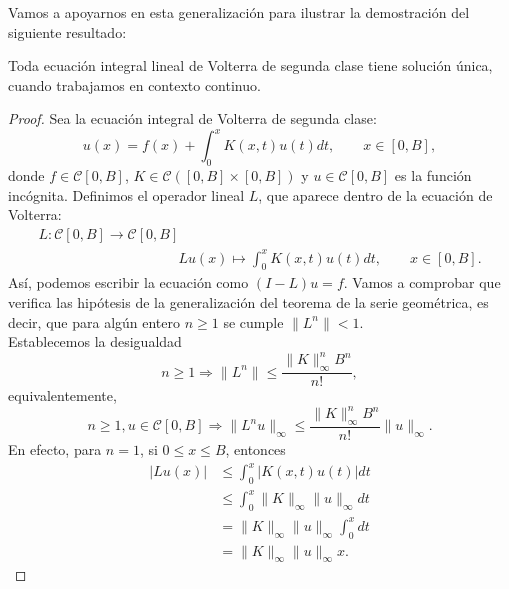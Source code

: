 Vamos a apoyarnos en esta generalización para ilustrar la demostración del siguiente resultado:
\begin{corolario}
	Toda ecuación integral lineal de Volterra de segunda clase tiene solución única, cuando trabajamos en contexto continuo.
\end{corolario}
\begin{proof}
	Sea la ecuación integral de Volterra de segunda clase:
	\begin{equation}
		u(x) = f(x) + \int_0^x K(x,t)u(t)dt, \qquad x \in [0,B],
	\end{equation}
	donde $f \in \mathcal{C}[0,B]$, $K \in \mathcal{C}([0,B]\times [0,B])$ y $u \in \mathcal{C}[0,B]$ es la función incógnita.
	Definimos el operador lineal $L$, que aparece dentro de la ecuación de Volterra:
	\begin{equation}
		\begin{array}{c}
		L: \mathcal{C}[0,B] \rightarrow \mathcal{C}[0,B] \\
		\qquad \qquad \qquad \qquad \qquad Lu(x) \mapsto \displaystyle \int_{0}^{x} K(x,t)u(t)dt, \qquad x \in [0,B].
		\end{array}
	\end{equation}
	Así, podemos escribir la ecuación como $(I-L)u = f$.
	Vamos a comprobar que verifica las hipótesis de la generalización del teorema de la serie geométrica, es decir, que para algún entero $n \geqslant 1$ se cumple $\lVert L^n \rVert < 1$.\\
	Establecemos la desigualdad
	\begin{equation}
		n \geqslant 1 \Rightarrow \lVert L^n \rVert \leqslant \dfrac{\lVert K \rVert_\infty^nB^n}{n!},
	\end{equation}
	equivalentemente,
	\begin{equation}\label{eq:ref}
		n \geqslant 1, u \in \mathcal{C}[0,B] \Rightarrow \lVert L^nu \rVert_\infty \leqslant \dfrac{\lVert K \rVert_\infty^nB^n}{n!}\lVert u \rVert_\infty.
	\end{equation}
	En efecto, para $n = 1$, si $0 \leqslant x \leqslant B$, entonces
	\begin{equation}
		\begin{split}
			\lvert Lu(x) \rvert & \leqslant \int_{0}^{x} |K(x,t)u(t)|dt \\
			& \leqslant \int_{0}^{x} \lVert K \rVert_\infty \lVert u \rVert_\infty dt\\
			& = \lVert K \rVert_\infty \lVert u \rVert_\infty \int_{0}^{x}dt\\
			& = \lVert K \rVert_\infty \lVert u \rVert_\infty x.

\end{split}
\end{equation}
\end{proof}
